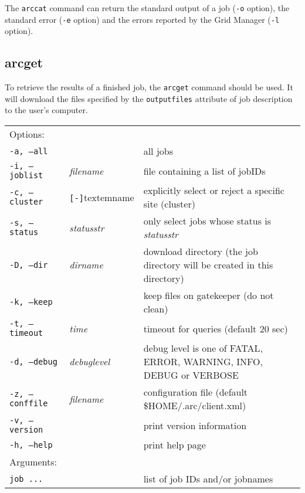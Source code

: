 The \texttt{arccat} command can return the standard output of a job
(\texttt{-o} option), the standard error (\texttt{-e} option) and the
errors reported by the Grid Manager (\texttt{-l} option).

\begin{framed}

\end{framed}


\subsection{arcget}
\label{sec:arcget}

To retrieve the results of a finished job, the \texttt{arcget}
 command should be used. It
will download the files specified by the \texttt{outputfiles}
attribute of job description to the user's computer.

\hspace*{0.5cm}
\begin{shaded}
\end{shaded}
\begin{longtable}{llp{8cm}}
   Options:&&\\
   \texttt{-a, --all}& & all jobs\\
   \texttt{-i, --joblist}& \textit{filename} & file containing a list of jobIDs\\
   \texttt{-c, --cluster}&\verb#[-]#textem{name}&explicitly select or reject a specific site (cluster)\\
   \texttt{-s, --status}& \textit{statusstr} &only select jobs whose status is \textit{statusstr}\\
   \texttt{-D, --dir} & \textit{dirname} & download directory (the job directory will be created in this directory)\\
   \texttt{-k, --keep}& & keep files on gatekeeper (do not clean)\\
   \texttt{-t, --timeout}& \textit{time} & timeout for queries (default 20 sec)\\
   \texttt{-d, --debug}& \textit{debuglevel}&debug level is one of  FATAL, ERROR, WARNING, INFO, DEBUG or VERBOSE\\
   \texttt{-z, --conffile}&\textit{filename}& configuration file (default {\$}HOME/.arc/client.xml)\\
   \texttt{-v, --version}& & print version information\\
   \texttt{-h, --help}& & print help page\\
   Arguments:&&\\
   \texttt{job ...} && list of job IDs and/or jobnames\\
\end{longtable}


